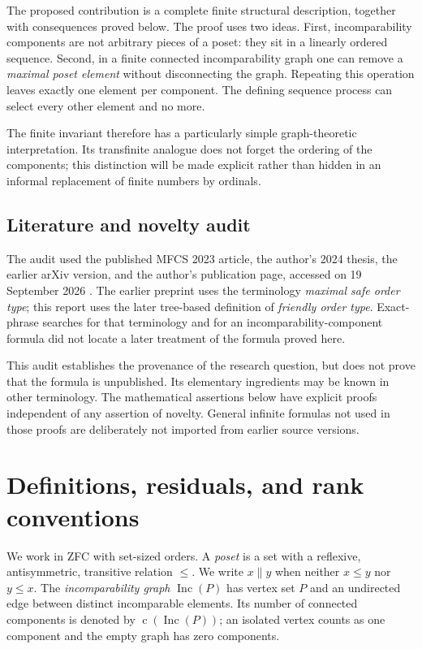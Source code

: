 \documentclass[11pt,letterpaper]{article}
\theoremstyle{definition}
\theoremstyle{remark}
\newcommand{\Inc}{\operatorname{Inc}}
\newcommand{\cc}{\operatorname{c}}
\begin{document}
The proposed contribution is a complete finite structural description,
together with consequences proved below. The proof uses two ideas. First,
incomparability components are not arbitrary pieces of a poset: they sit in
a linearly ordered sequence. Second, in a finite connected incomparability
graph one can remove a \emph{maximal poset element} without disconnecting
the graph. Repeating this operation leaves exactly one element per component.
The defining sequence process can select every other element and no more.

The finite invariant therefore has a particularly simple graph-theoretic
interpretation. Its transfinite analogue does not forget the ordering of the
components; this distinction will be made explicit rather than hidden in an
informal replacement of finite numbers by ordinals.

\subsection{Literature and novelty audit}
The audit used the published MFCS 2023 article, the author's 2024 thesis,
the earlier arXiv version, and the author's publication page, accessed on
19 September 2026 \cite{VialardMFCS,VialardThesis,VialardArxiv,VialardHome}.
The earlier preprint uses the terminology \emph{maximal safe order type};
this report uses the later tree-based definition of \emph{friendly order type}.
Exact-phrase searches for that terminology and for an incomparability-component
formula did not locate a later treatment of the formula proved here.

This audit establishes the provenance of the research question, but does not
prove that the formula is unpublished. Its elementary ingredients may be
known in other terminology. The mathematical assertions below have explicit
proofs independent of any assertion of novelty. General infinite formulas
not used in those proofs are deliberately not imported from earlier source
versions.

\section{Definitions, residuals, and rank conventions}
\label{sec:definitions}
We work in ZFC with set-sized orders. A \emph{poset} is a set with a reflexive, antisymmetric, transitive relation
$\leq$. We write $x\parallel y$ when neither $x\leq y$ nor $y\leq x$.
The \emph{incomparability graph} $\Inc(P)$ has vertex set $P$ and an
undirected edge between distinct incomparable elements. Its number of
connected components is denoted by $\cc(\Inc(P))$; an isolated vertex counts
as one component and the empty graph has zero components.
\end{document}
